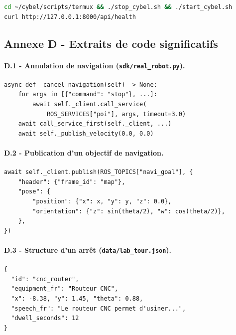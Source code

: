 \begin{lstlisting}[style=terminal, language=bash, caption={Commandes Termux (tablette)}, basicstyle=\ttfamily\footnotesize, breaklines=true, xleftmargin=0.05\textwidth, xrightmargin=0.05\textwidth]
cd ~/cybel/scripts/termux && ./stop_cybel.sh && ./start_cybel.sh
curl http://127.0.0.1:8000/api/health
\end{lstlisting}

\subsection*{Annexe D - Extraits de code significatifs}

\paragraph{D.1 - Annulation de navigation (\texttt{sdk/real\_robot.py}).}

\begin{verbatim}
async def _cancel_navigation(self) -> None:
    for args in [{"command": "stop"}, ...]:
        await self._client.call_service(
            ROS_SERVICES["poi"], args, timeout=3.0)
    await call_service_first(self._client, ...)
    await self._publish_velocity(0.0, 0.0)
\end{verbatim}

\paragraph{D.2 - Publication d'un objectif de navigation.}

\begin{verbatim}
await self._client.publish(ROS_TOPICS["navi_goal"], {
    "header": {"frame_id": "map"},
    "pose": {
        "position": {"x": x, "y": y, "z": 0.0},
        "orientation": {"z": sin(theta/2), "w": cos(theta/2)},
    },
})
\end{verbatim}

\paragraph{D.3 - Structure d'un arrêt (\texttt{data/lab\_tour.json}).}

\begin{verbatim}
{
  "id": "cnc_router",
  "equipment_fr": "Routeur CNC",
  "x": -8.38, "y": 1.45, "theta": 0.88,
  "speech_fr": "Le routeur CNC permet d'usiner...",
  "dwell_seconds": 12
}
\end{verbatim}

